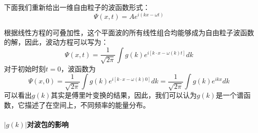 \documentclass{article}
\begin{document}
下面我们重新给出一维自由粒子的波函数形式：
\[\Psi(x,t)=Ae^{i(kx-\omega t)}\]

根据线性方程的可叠加性，这个平面波的所有线性组合均能够成为自由粒子波函数的解，因此，波动方程可以写为：
\[\Psi(x,t)=\frac{1}{\sqrt{2\pi}}\int g(k)e^{i\left[k\cdot x-\omega(k)t\right]}dk\]
对于初始时刻$t=0$，波函数为
\[\Psi(x,0)=\frac{1}{\sqrt{2\pi}}\int g(k)e^{i\left[k\cdot x-\omega(k)0\right]}dk=\frac{1}{\sqrt{2\pi}}\int g(k)e^{ikx}dk\]
可以看出$g(k)$其实是傅里叶变换的结果，因此，我们可以认为$g(k)$是一个谱函数，它描述了在空间上，不同频率的能量分布。


\paragraph{$|g(k)|$对波包的影响}\ \\
\end{document}
